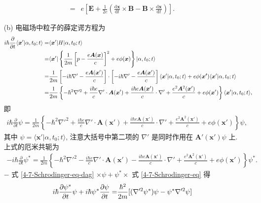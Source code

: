 \documentclass{assignment}
\begin{document}
\begin{pf}
\begin{itemize}
\begin{align}
            =&e\left[\bm{E}+\frac{1}{2c}\left(\frac{\mathrm{d}\bm{x}}{\mathrm{d}t}\times\bm{B}-\bm{B}\times\frac{\mathrm{d}\bm{x}}{\mathrm{d}t}\right)\right].
        \end{align}
        \item[(b)] 电磁场中粒子的薛定谔方程为
        \begin{align}
            \notag i\hbar\frac{\partial}{\partial t}\langle\bm{x}'\vert\alpha,t_0;t\rangle=&\langle\bm{x}'\rvert H\lvert\alpha,t_0;t\rangle\\
            \notag=&\langle\bm{x}'\rvert\left\{\frac{1}{2m}\left[p-\frac{e\bm{A}(\bm{x})}{c}\right]^2+e\phi(\bm{x})\right\}\lvert\alpha,t_0;t\rangle\\
            \notag=&\frac{1}{2m}\left[-i\hbar\nabla'-\frac{e\bm{A}(\bm{x}')}{c}\right]\cdot\left[-i\hbar\nabla'-\frac{e\bm{A}(\bm{x}')}{c}\right]\langle\bm{x}'\vert\alpha,t_0;t\rangle+e\phi(\bm{x'})\langle\bm{x}'\vert\alpha,t_0;t\rangle\\
            =&\frac{1}{2m}\left\{-\hbar^2\nabla'^2+\frac{i\hbar e}{c}\nabla'\cdot\bm{A}(\bm{x}')+\frac{i\hbar e\bm{A}(\bm{x}')}{c}\cdot\nabla'+\frac{e^2\bm{A}^2(\bm{x}')}{c}+e\phi(\bm{x}')\right\}\langle\bm{x}'\vert\alpha,t_0;t\rangle,
        \end{align}
        即
        \begin{align}
            \label{4-7-Schrodinger-eq}
            i\hbar\frac{\partial}{\partial t}\psi=\frac{1}{2m}\left\{-\hbar^2\nabla'^2+\frac{i\hbar e}{c}\nabla'\cdot\bm{A}(\bm{x}')+\frac{i\hbar e\bm{A}(\bm{x}')}{c}\cdot\nabla'+\frac{e^2\bm{A}^2(\bm{x}')}{c}+e\phi(\bm{x}')\right\}\psi,
        \end{align}
        其中 $\psi=\langle\bm{x}'\vert\alpha,t_0;t\rangle$, 注意大括号中第二项的 $\nabla'$ 是同时作用在 $\bm{A}'(\bm{x}')\psi$ 上.
        上式的厄米共轭为
        \begin{align}
            \label{4-7-Schrodinger-eq-dag}
            -i\hbar\frac{\partial}{\partial t}\psi^*=\frac{1}{2m}\left\{-\hbar^2\nabla'^2-\frac{i\hbar e}{c}\nabla'\cdot\bm{A}(\bm{x}')-\frac{i\hbar e\bm{A}(\bm{x}')}{c}\cdot\nabla'+\frac{e^2\bm{A}^2(\bm{x}')}{c}+e\phi(\bm{x}')\right\}\psi^*.
        \end{align}
        $-$ 式 \eqref{4-7-Schrodinger-eq-dag} $\times\psi+\psi^*\times$ 式 \eqref{4-7-Schrodinger-eq} 得
        \begin{align}
            \label{4-7-main}
            \notag i\hbar\frac{\partial\psi^*}{\partial t}\psi+i\hbar\psi^*\frac{\partial\psi}{\partial t}=&\frac{\hbar^2}{2m}[(\nabla'^2\psi^*)\psi-\psi^*\nabla'^2\psi]\\

\end{align}
\end{itemize}
\end{pf}
\end{document}
